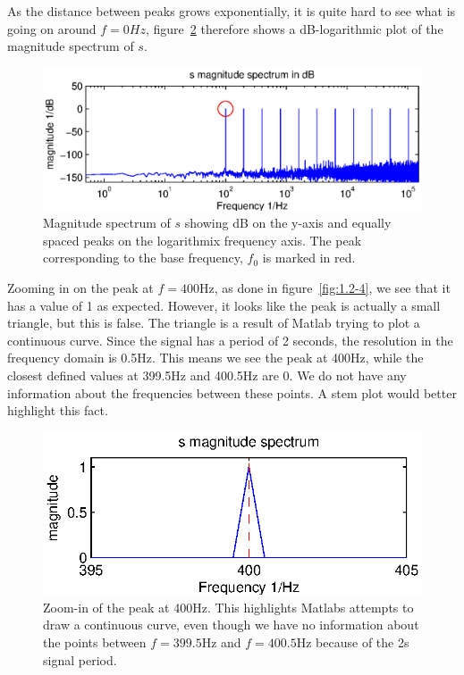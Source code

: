 As the distance between peaks grows exponentially, it is quite hard to see what is going on around \(f=0Hz\), figure~\ref{fig:1.2-3}
therefore shows a dB-logarithmic plot of the magnitude spectrum of \(s\).

\begin{figure}[H]
	\center
	\includegraphics{./picture/3-1-4.eps}
	\caption{Magnitude spectrum of \(s\) showing dB on the y-axis and equally spaced peaks on the logarithmix frequency axis.
	The peak corresponding to the base frequency, \(f_0\) is marked in red.}
	\label{fig:1.2-3}
\end{figure}

Zooming in on the peak at \(f=400\)Hz, as done in figure~\ref{fig:1.2-4}, we see that it has a value of 1 as expected. However, 
it looks like the peak is actually a small triangle, but this is false. The triangle is a result of Matlab trying to plot a 
continuous curve. Since the signal has a period of 2 seconds, the resolution in the frequency domain is 0.5Hz. This means we
see the peak at 400Hz, while the closest defined values at 399.5Hz and 400.5Hz are 0. We do not have any information about the
frequencies between these points. A stem plot would better highlight this fact.

\begin{figure}[H]
	\center
	\includegraphics{./picture/3-1-5.eps}
	\caption{Zoom-in of the peak at 400Hz. This highlights Matlabs attempts to draw a continuous curve, even though we have no information about the points between \(f=399.5\)Hz and \(f=400.5\)Hz because of the 2s signal period.}
	\label{fig:1.2-3}
\end{figure}

